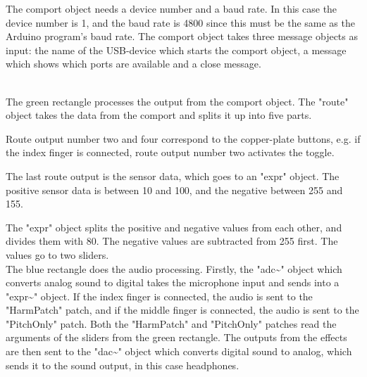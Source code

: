 The comport object needs a device number and a baud rate. In this case the device number is 1, and the baud rate is 4800 since this must be the same as the Arduino program's baud rate. The comport object takes three message objects as input: the name of the USB-device which starts the comport object, a message which shows which ports are available and a close message.   \\

\begin{minipage}{\linewidth}%
\label{PD_main}
\end{minipage}\\

The green rectangle processes the output from the comport object. The "route" object takes the data from the comport and splits it up into five parts. 

Route output number two and four correspond to the copper-plate buttons, e.g. if the index finger is connected, route output number two activates the toggle. 

The last route output is the sensor data, which goes to an "expr" object. The positive sensor data is between 10 and 100, and the negative between 255 and 155. 

The "expr" object splits the positive and negative values from each other, and divides them with 80. The negative values are subtracted from 255 first. The values go to two sliders.\\

The blue rectangle does the audio processing. Firstly, the "adc\textasciitilde" object which converts analog sound to digital takes the microphone input and sends into a "expr\textasciitilde" object. If the index finger is connected, 
the audio is sent to the "HarmPatch" patch, and if the middle finger is connected, the audio is sent to the "PitchOnly" patch. Both the "HarmPatch" and "PitchOnly" patches read the arguments of the sliders from the green rectangle. The outputs from the effects are then sent to the "dac\textasciitilde" object which converts digital sound to analog, which sends it to the sound output, in this case headphones.\\

